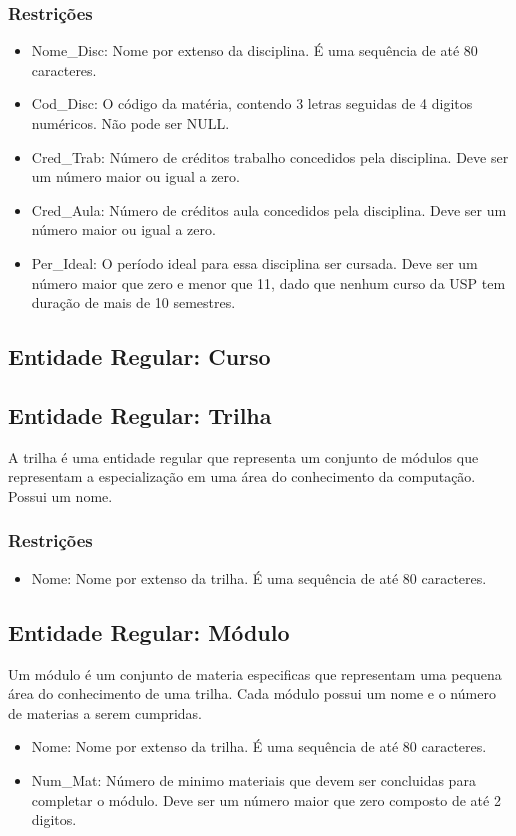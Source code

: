 \documentclass{article}
\begin{document}
  	    \subsubsection{Restrições}
  	        \begin{itemize}
  		        \item Nome\_Disc: Nome por extenso da disciplina. É uma sequência de até 80 caracteres.
  		        \item Cod\_Disc: O código da matéria, contendo 3 letras seguidas de 4 digitos numéricos. Não pode ser NULL.
  		        \item Cred\_Trab: Número de créditos trabalho concedidos pela disciplina. Deve ser um número maior ou igual a zero.
  		        \item Cred\_Aula: Número de créditos aula concedidos pela disciplina. Deve ser um número maior ou igual a zero.
  		        \item Per\_Ideal: O período ideal para essa disciplina ser cursada. Deve ser um número maior que zero e menor que 11, dado que nenhum curso da USP tem duração de mais de 10 semestres.
  		    \end{itemize}
  		    
  	\subsection{Entidade Regular: Curso}
  	
  	
  	
  	
  	
  	\subsection{Entidade Regular: Trilha}
  	    \quad A trilha é uma entidade regular que representa um conjunto de módulos que representam a especialização em uma área do conhecimento da computação. Possui um nome.
  	    \subsubsection{Restrições}
  	        \begin{itemize}
  	            \item Nome: Nome por extenso da trilha. É uma sequência de até 80 caracteres.
  		    \end{itemize}
  		    
  	\subsection{Entidade Regular: Módulo}
  	    \quad Um módulo é um conjunto de materia especificas que representam uma pequena área do conhecimento de uma trilha. Cada módulo possui um nome e o número de materias a serem cumpridas.
  	    \begin{itemize}
  	            \item Nome: Nome por extenso da trilha. É uma sequência de até 80 caracteres.
  	            \item Num\_Mat: Número de minimo materiais que devem ser concluidas para completar o módulo. Deve ser um número maior que zero composto de até 2 digitos. 
  		    \end{itemize}
  		    
\end{document}
